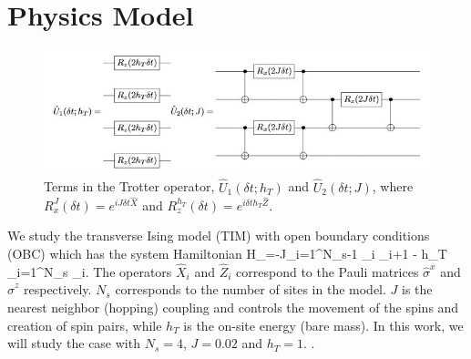 \section{Physics Model}
\label{sec:model}

\begin{figure}[htpb]
\includegraphics[width=\textwidth]{circuits2.JPG}
\caption{Terms in the Trotter operator, $\hat{U}_1(\delta t; h_T)$ and $\hat{U}_2(\delta t; J)$, 
where $R_x^J(\delta t) = e^{i J \delta t \hat{X}}$ and $R_z^{h_T}(\delta t) = e^{i \delta t h_T \hat{Z}}$.}
\label{fig:trotteroperators}
\end{figure}

We study the transverse Ising model (TIM) with open boundary conditions (OBC) which  has the system Hamiltonian 
\be
H_{}=-J\sum_{i=1}^{N_s-1} _i _{i+1} - h_T \sum_{i=1}^{N_s} _i. \label{eq:H_OBC}
\ee
{}
The operators $\hat{X}_i$ and $\hat{Z}_i$ correspond to the Pauli matrices $\hat{\sigma}^x$ and $\hat{\sigma}^z$ respectively. $N_s$ corresponds to the number of sites in the model. $J$ is the nearest neighbor (hopping) coupling and controls the movement of the spins and creation of spin pairs, while $h_T$ is the on-site energy (bare mass). In this work, we will study the case with $N_s=4$, $J=0.02$ and $h_T=1$. .



